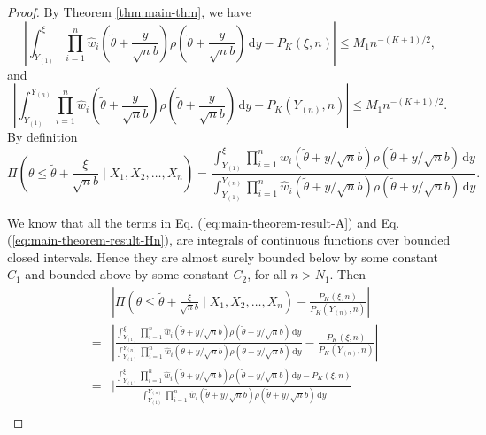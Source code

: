 \documentclass[oneside,english]{amsbook}
\numberwithin{section}{chapter}
\numberwithin{equation}{section}
\numberwithin{figure}{section}
\theoremstyle{plain}
\theoremstyle{plain}
\theoremstyle{definition}
\theoremstyle{plain}
\theoremstyle{plain}
\theoremstyle{remark}
\theoremstyle{definition}
\theoremstyle{definition}
\newcommand{\diff}{\,\mathrm{d}}
\begin{document}
\begin{proof}
By Theorem \ref{thm:main-thm}, we have 
\begin{equation}
\left|\int_{Y_{\left(1\right)}}^{\xi}\prod_{i=1}^{n}\hat{w}_{i}\left(\tilde{\theta}+\frac{y}{\sqrt{n}b}\right)\rho\left(\tilde{\theta}+\frac{y}{\sqrt{n}b}\right)\diff y-P_{K}\left(\xi,n\right)\right|\le M_{1}n^{-\left(K+1\right)/2},\label{eq:main-theorem-result-A}
\end{equation}
and 
\begin{equation}
\left|\int_{Y_{\left(1\right)}}^{Y_{\left(n\right)}}\prod_{i=1}^{n}\hat{w}_{i}\left(\tilde{\theta}+\frac{y}{\sqrt{n}b}\right)\rho\left(\tilde{\theta}+\frac{y}{\sqrt{n}b}\right)\diff y-P_{K}\left(Y_{\left(n\right)},n\right)\right|\le M_{1}n^{-\left(K+1\right)/2}.\label{eq:main-theorem-result-Hn}
\end{equation}
By definition 
\[
\Pi\left(\theta\le\tilde{\theta}+\frac{\xi}{\sqrt{n}b}\mid X_{1},X_{2},\ldots,X_{n}\right)=\frac{\int_{Y_{\left(1\right)}}^{\xi}\prod_{i=1}^{n}\hat{w}_{i}\left(\tilde{\theta}+y/\sqrt{n}b\right)\rho\left(\tilde{\theta}+y/\sqrt{n}b\right)\diff y}{\int_{Y_{\left(1\right)}}^{Y_{\left(n\right)}}\prod_{i=1}^{n}\hat{w}_{i}\left(\tilde{\theta}+y/\sqrt{n}b\right)\rho\left(\tilde{\theta}+y/\sqrt{n}b\right)\diff y}.
\]

We know that all the terms in Eq. (\ref{eq:main-theorem-result-A}) and Eq. (\ref{eq:main-theorem-result-Hn}),
are integrals of continuous functions over bounded closed intervals.
Hence they are almost surely bounded below by some constant $C_{1}$ and
bounded above by some constant $C_{2}$, for all $n>N_{1}$. Then
\begin{eqnarray}
 &  & \left|\Pi\left(\theta\le\tilde{\theta}+\frac{\xi}{\sqrt{n}b}\mid X_{1},X_{2},\ldots,X_{n}\right)-\frac{P_{K}\left(\xi,n\right)}{P_{K}\left(Y_{\left(n\right)},n\right)}\right|\nonumber \\
 & = & \left|\frac{\int_{Y_{\left(1\right)}}^{\xi}\prod_{i=1}^{n}\hat{w}_{i}\left(\tilde{\theta}+y/\sqrt{n}b\right)\rho\left(\tilde{\theta}+y/\sqrt{n}b\right)\diff y}{\int_{Y_{\left(1\right)}}^{Y_{\left(n\right)}}\prod_{i=1}^{n}\hat{w}_{i}\left(\tilde{\theta}+y/\sqrt{n}b\right)\rho\left(\tilde{\theta}+y/\sqrt{n}b\right)\diff y}-\frac{P_{K}\left(\xi,n\right)}{P_{K}\left(Y_{\left(n\right)},n\right)}\right|\nonumber \\
 & = & \Bigg|\frac{\int_{Y_{\left(1\right)}}^{\xi}\prod_{i=1}^{n}\hat{w}_{i}\left(\tilde{\theta}+y/\sqrt{n}b\right)\rho\left(\tilde{\theta}+y/\sqrt{n}b\right)\diff y-P_{K}\left(\xi,n\right)}{\int_{Y_{\left(1\right)}}^{Y_{\left(n\right)}}\prod_{i=1}^{n}\hat{w}_{i}\left(\tilde{\theta}+y/\sqrt{n}b\right)\rho\left(\tilde{\theta}+y/\sqrt{n}b\right)\diff y}\nonumber \\

\end{eqnarray}
\end{proof}
\end{document}
